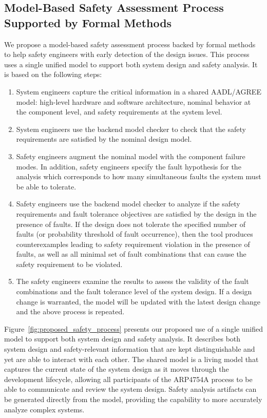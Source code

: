 \subsection{Model-Based Safety Assessment Process Supported by Formal Methods}
We propose a model-based safety assessment process backed by formal methods to help safety engineers with early detection of the design issues.  This process uses a single unified model to support both system design and safety analysis. It is based on the following steps:

\begin{enumerate}
	\item System engineers capture the critical information in a shared AADL/AGREE model:  high-level hardware and software architecture, nominal behavior at the component level, and safety requirements at the system level.%
	\item System engineers use the backend model checker to check that the safety requirements are satisfied by the nominal design model. 
	\item Safety engineers augment the nominal model with the component failure modes. %
	In addition, safety engineers specify the fault hypothesis for the analysis which corresponds to how many simultaneous faults the system must be able to tolerate.
	\item Safety engineers use the backend model checker to analyze if the safety requirements and fault tolerance objectives are satisfied by the design in the presence of faults. %
	If the design does not tolerate the specified number of faults (or probability threshold of fault occurrence), then the tool produces counterexamples leading to safety requirement violation in the presence of faults, %
	 as well as all minimal set of fault combinations that can cause the safety requirement to be violated.
	\item The safety engineers examine the results to assess the validity of the fault combinations and the fault tolerance level of the system design. If a design change is warranted, the model will be updated with the latest design change and the above process is repeated.
\end{enumerate}

Figure~\ref{fig:proposed_safety_process} presents our proposed use of a single unified model to support both system design and safety analysis. It describes both system design and safety-relevant information that are kept distinguishable and yet are able to interact with each other. The shared model is a living model that captures the current state of the system design as it moves through the development lifecycle, allowing all participants of the ARP4754A process to be able to communicate and review the system design. Safety analysis artifacts can be generated directly from the model, providing the capability to more accurately analyze complex systems.

